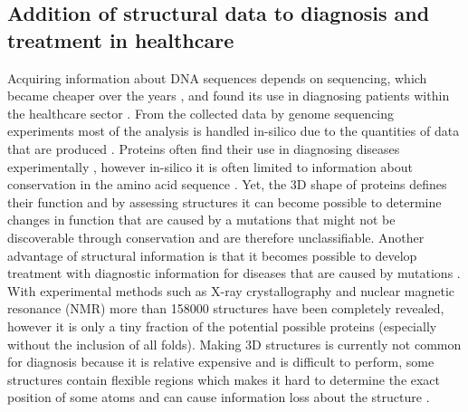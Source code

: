 \subsection{Addition of structural data to diagnosis and treatment in healthcare}
Acquiring information about DNA sequences depends on sequencing, which became cheaper over the years \cite{nih_cost_nodate}, and found its use in diagnosing patients within the healthcare sector \cite{ van_der_velde_gavin:_2017}.
From the collected data by genome sequencing experiments most of the analysis is handled in-silico due to the quantities of data that are produced \cite{ van_der_velde_gavin:_2017}. Proteins often find their use in diagnosing diseases experimentally \cite{hortin_introduction:_2010, bennion_protein_2002}, however in-silico it is often limited to information about conservation in the amino acid sequence \cite{ng_sift:_2003}.
%
Yet, the 3D shape of proteins defines their function \cite{nanev_how_2008} and by assessing structures it can become possible to determine changes in function that are caused by a mutations that might not be discoverable through conservation and are therefore unclassifiable.
Another advantage of structural information is that it becomes possible to develop treatment with diagnostic information for diseases that are caused by mutations \cite{niu_protein-structure-guided_2016}.
With experimental methods such as X-ray crystallography and nuclear magnetic resonance (NMR) more than 158000 structures \cite{wwpdb_wwpdb:_nodate} have been completely revealed, however it is only a tiny fraction of the potential possible proteins \cite{ cantrill_chemiotics:_nodate} (especially without the inclusion of all folds).
Making 3D structures is currently not common for diagnosis because it is relative expensive and is difficult to perform, some structures contain flexible regions which makes it hard to determine the exact position of some atoms and can cause information loss about the structure \cite{pdb101_pdb101:_nodate, ridgen_protein_nodate}.
